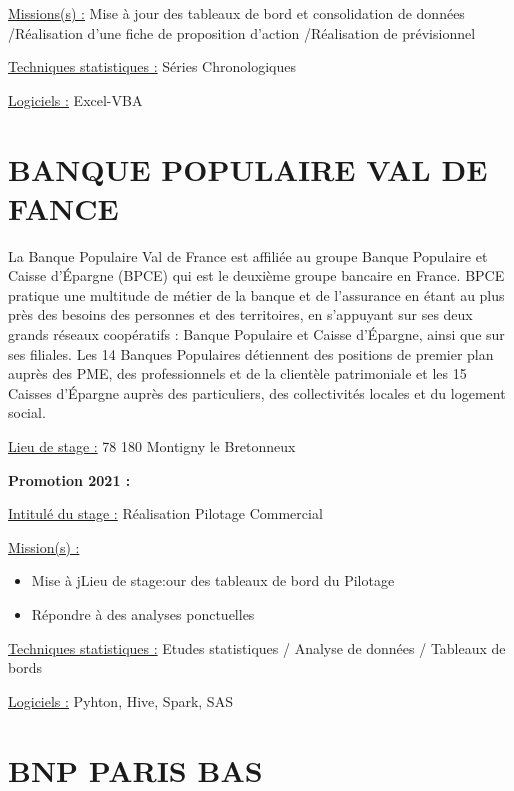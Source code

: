 \documentclass[
  letterpaper,
  DIV=11,
  numbers=noendperiod]{scrreprt}
\begin{document}
\uline{Missions(s) :} Mise à jour des tableaux de bord et consolidation
de données /Réalisation d'une fiche de proposition d'action /Réalisation
de prévisionnel

\uline{Techniques statistiques :} Séries Chronologiques

\uline{Logiciels :} Excel-VBA

\hypertarget{banque-populaire-val-de-fance}{%
\section{\texorpdfstring{\textbf{BANQUE POPULAIRE VAL DE
FANCE}}{BANQUE POPULAIRE VAL DE FANCE}}\label{banque-populaire-val-de-fance}}

La Banque Populaire Val de France est affiliée au groupe Banque
Populaire et Caisse d'Épargne (BPCE) qui est le deuxième groupe bancaire
en France. BPCE pratique une multitude de métier de la banque et de
l'assurance en étant au plus près des besoins des personnes et des
territoires, en s'appuyant sur ses deux grands réseaux coopératifs :
Banque Populaire et Caisse d'Épargne, ainsi que sur ses filiales. Les 14
Banques Populaires détiennent des positions de premier plan auprès des
PME, des professionnels et de la clientèle patrimoniale et les 15
Caisses d'Épargne auprès des particuliers, des collectivités locales et
du logement social.

\uline{Lieu de stage :} 78 180 Montigny le Bretonneux

\textbf{Promotion 2021 :}

\uline{Intitulé du stage :} Réalisation Pilotage Commercial

\uline{Mission(s) :}

\begin{itemize}
\item
  Mise à jLieu de stage:our des tableaux de bord du Pilotage
\item
  Répondre à des analyses ponctuelles
\end{itemize}

\uline{Techniques statistiques :} Etudes statistiques / Analyse de
données / Tableaux de bords

\uline{Logiciels :} Pyhton, Hive, Spark, SAS

\hypertarget{bnp-paris-bas}{%
\section{\texorpdfstring{\textbf{BNP PARIS
BAS}}{BNP PARIS BAS}}\label{bnp-paris-bas}}
\end{document}
